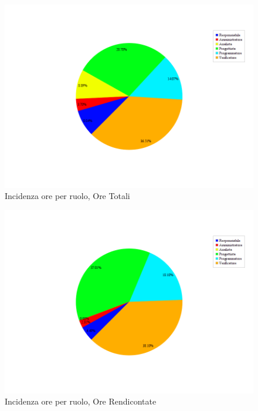 \begin{figure}[H]
	\centering
	\includegraphics[scale=0.3]{immagini/Grafi/OreRuoloOreTotali}
	\caption{Incidenza ore per ruolo, Ore Totali}
\end{figure}

\begin{figure}[H]
	\centering
	\includegraphics[scale=0.3]{immagini/Grafi/OreRuoloRendicontabili}
	\caption{Incidenza ore per ruolo, Ore Rendicontate}
\end{figure}
